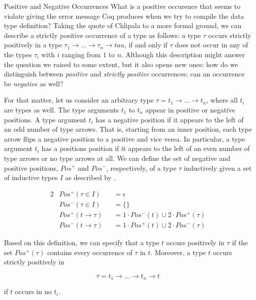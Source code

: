 \begin{excursus}{Positive and Negative Occurrences}
What is a positive occurence that  seems to violate giving
the error message Coq produces when we try to compile the data type
definition?
Taking the quote of Chlipala to a more formal ground, we can describe
a strictly positive occurrence of a type as follows: a type $\tau$
occurs strictly positively in a type $\tau_1\rightarrow \dots
\rightarrow \tau_n \rightarrow tau$, if and only if $\tau$ does not
occur in any of the types $\tau_i$ with $i$ ranging from $1$ to $n$.
Although this description might answer the question we raised to some
extent, but it also opens new ones: how do we distinguish between
\emph{positive} and \emph{strictly positive} occurrences; can an
occurrence be \emph{negative} as well?

For that matter, let us consider an arbitrary type $\tau = t_1
\rightarrow \dots \rightarrow t_n$, where all $t_i$ are types as well.
The type arguments $t_1$ to $t_n$ appear in positive or negative
positions.
A type argument $t_i$ has a negative position if it appears to the
left of an odd number of type arrows.
That is, starting from an inner position, each type arrow flips a
negative position to a positive and vice versa.
In particular, a type argument $t_i$ has a positions position if it
appears to the left of an even number of type arrows or no type arrows
at all.
We can define the set of negative and positive positions, $Pos^{+}$
and $Pos^{-}$, respectively, of a type $\tau$ inductively given a set of
inductive types $I$ as described by
\citet{blanqui2002inductivedatatype}.

\begin{alignat*}{2}
  &Pos^{+} (\tau \in I) &&= \epsilon\\
  &Pos^{-} (\tau \in I) &&= \{\}\\
  &Pos^{+} (t \rightarrow \tau) &&= 1 \cdot Pos^{-} (t) \cup 2 \cdot Pos^{+} (\tau)\\
  &Pos^{-} (t \rightarrow \tau) &&= 1 \cdot Pos^{+} (t) \cup 2 \cdot Pos^{-} (\tau)
\end{alignat*}

Based on this definition, we can specify that a type $t$ occurs
positively in $\tau$ if the set $Pos^{+} (\tau)$ contains every occurrence of $\tau$ in
$t$.
Moreover, a type $t$ occurs strictly positively in

\[
\tau = t_1 \rightarrow \dots \rightarrow t_n \rightarrow t
\]

if $t$ occurs in no $t_i$.


\end{excursus}
